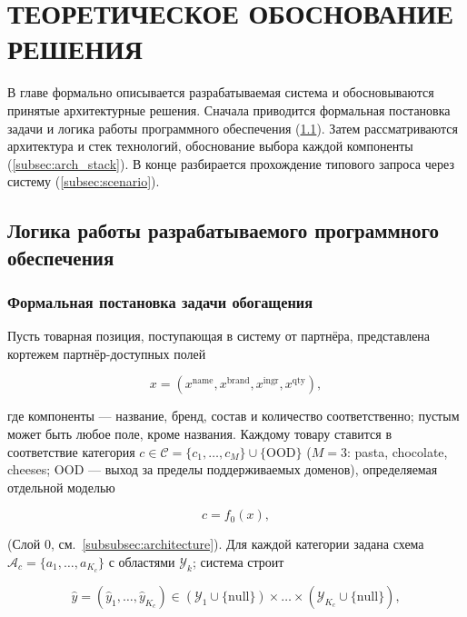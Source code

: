 
\section{ТЕОРЕТИЧЕСКОЕ ОБОСНОВАНИЕ РЕШЕНИЯ}

В главе формально описывается разрабатываемая система и обосновываются принятые архитектурные решения. Сначала приводится формальная постановка задачи и логика работы программного обеспечения (\ref{subsec:formal_task}). Затем рассматриваются архитектура и стек технологий, обоснование выбора каждой компоненты (\ref{subsec:arch_stack}). В конце разбирается прохождение типового запроса через систему (\ref{subsec:scenario}).

\subsection{Логика работы разрабатываемого программного обеспечения}
\label{subsec:formal_task}

\subsubsection{Формальная постановка задачи обогащения}

Пусть товарная позиция, поступающая в систему от партнёра, представлена кортежем партнёр-доступных полей

\begin{equation}
\label{eq:2.1}
x = (x^{\text{name}}, x^{\text{brand}}, x^{\text{ingr}}, x^{\text{qty}}),
\end{equation}

где компоненты — название, бренд, состав и количество соответственно; пустым может быть любое поле, кроме названия. Каждому товару ставится в соответствие категория $c \in \mathcal{C} = \{c_1, \dots, c_M\} \cup \{\text{OOD}\}$ ($M = 3$: pasta, chocolate, cheeses; OOD — выход за пределы поддерживаемых доменов), определяемая отдельной моделью

\begin{equation}
\label{eq:2.2}
c = f_0(x),
\end{equation}

(Слой 0, см.~\ref{subsubsec:architecture}). Для каждой категории задана схема $\mathcal{A}_c = \{a_1, \dots, a_{K_c}\}$ с областями $\mathcal{Y}_k$; система строит

\begin{equation}
\label{eq:2.3}
\hat{y} = (\hat{y}_1, \dots, \hat{y}_{K_c}) \in (\mathcal{Y}_1 \cup \{\text{null}\}) \times \dots \times (\mathcal{Y}_{K_c} \cup \{\text{null}\}),
\end{equation}


